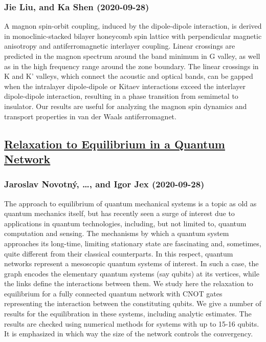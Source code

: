 \subsubsection*{Jie Liu, and Ka Shen (2020-09-28)}
A magnon spin-orbit coupling, induced by the dipole-dipole interaction, is
derived in monoclinic-stacked bilayer honeycomb spin lattice with perpendicular
magnetic anisotropy and antiferromagnetic interlayer coupling. Linear crossings
are predicted in the magnon spectrum around the band minimum in G valley, as
well as in the high frequency range around the zone boundary. The linear
crossings in K and K' valleys, which connect the acoustic and optical bands,
can be gapped when the intralayer dipole-dipole or Kitaev interactions exceed
the interlayer dipole-dipole interaction, resulting in a phase transition from
semimetal to insulator. Our results are useful for analyzing the magnon spin
dynamics and transport properties in van der Waals antiferromagnet.

\subsection*{\href{http://arxiv.org/abs/2009.13657v1}{Relaxation to Equilibrium in a Quantum Network}}
\subsubsection*{Jaroslav Novotný, \dots, and Igor Jex (2020-09-28)}
The approach to equilibrium of quantum mechanical systems is a topic as old
as quantum mechanics itself, but has recently seen a surge of interest due to
applications in quantum technologies, including, but not limited to, quantum
computation and sensing. The mechanisms by which a quantum system approaches
its long-time, limiting stationary state are fascinating and, sometimes, quite
different from their classical counterparts. In this respect, quantum networks
represent a mesoscopic quantum systems of interest. In such a case, the graph
encodes the elementary quantum systems (say qubits) at its vertices, while the
links define the interactions between them. We study here the relaxation to
equilibrium for a fully connected quantum network with CNOT gates representing
the interaction between the constituting qubits. We give a number of results
for the equilibration in these systems, including analytic estimates. The
results are checked using numerical methods for systems with up to 15-16
qubits. It is emphasized in which way the size of the network controls the
convergency.

